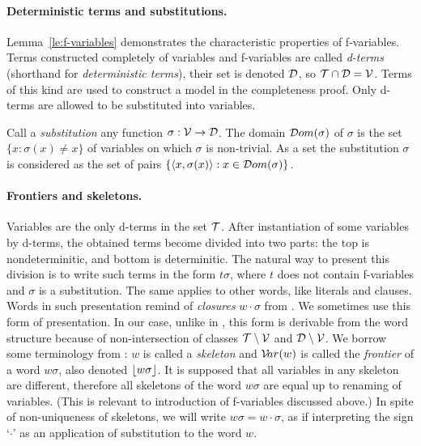 \paragraph{Deterministic terms and substitutions.\ }
%
Lemma~\ref {le:f-variables}
demonstrates the characteristic properties of f-variables.  
Terms constructed completely
of variables and f-variables are called {\em d-terms} (shorthand for {\em
deterministic terms}), their set is denoted ${\cal D}$, so \({\cal T} \cap
{\cal D} ={\cal V}\).  Terms of this kind are used to construct a model in the
completeness proof.  Only d-terms are allowed to be substituted into
variables.

\begin{definition}\label{def:substitution}
Call a {\em substitution} any function \(\sigma:{\cal V} \to {\cal D}\).  The
domain \({\sl{\cal D}om} (\sigma)\) of $\sigma$ is the set \(\{x: \sigma(x) \neq x\}\)
of variables on which $\sigma$ is non-trivial.  As a set the substitution
$\sigma$ is considered as the set of pairs \(\{\langle x,\sigma(x)\rangle: x\in{\sl{\cal D}om}
(\sigma)\}\).
\end{definition}

\paragraph{Frontiers and skeletons.\ }  

Variables are the only d-terms in the
set ${\cal T}$.  After instantiation of some variables by d-terms, the
obtained terms become divided into two parts: the top is nondeterminitic, and
bottom is determinitic.  The natural way to present this division is to write
such terms in the form \(t\sigma\), where $t$ does not contain f-variables
and $\sigma$ is a substitution.  The same applies to other words, like
literals and clauses.  Words in such presentation remind of {\em
closures} \(w\cdot \sigma\) from \cite {Basic-par}.  We sometimes use this
form of presentation.  In our case, unlike in \cite {Basic-par},
this form is derivable from the word structure because of non-intersection of
classes \({\cal T} \setminus {\cal V}\) and \({\cal D} \setminus {\cal V}\).  We
borrow some terminology from \cite {Basic-par}: $w$ is called a {\em
skeleton} and \({\sl{\cal V}\!ar}(w)\) is called the {\em frontier} of a word \(w\sigma\),
also denoted \(\lfloor w\sigma\rfloor\).  It is supposed that all variables in
any skeleton are different, therefore all skeletons of the word \(w\sigma\)
are equal up to renaming of variables.  (This is relevant to introduction of
f-variables discussed above.)  In spite of non-uniqueness of skeletons, we
will write \(w\sigma=w\cdot \sigma\), as if interpreting the sign
`$\cdot $' as an application of substitution to the word $w$.

